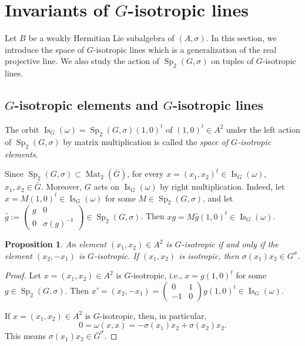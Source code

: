 \documentclass[a4paper,oneside,11pt]{amsart}
\DeclareMathOperator{\Mat}{Mat}
\DeclareMathOperator{\Sp}{Sp}
\DeclareMathOperator{\Is}{Is}
\theoremstyle{plain}
\newtheorem{prop}[teo]{Proposition}
\theoremstyle{definition}
\theoremstyle{remark}
\newcommand{\defin}{\emph}
\begin{document}
\section{Invariants of \texorpdfstring{$G$}{G}-isotropic lines}\label{G-lines}

Let $B$ be a weakly Hermitian Lie subalgebra of $(A,\sigma)$. In this section, we introduce the space of $G$-isotropic lines which is a generalization of the real projective line. We also study the action of $\Sp_2(G,\sigma)$ on tuples of  $G$-isotropic lines.

\subsection{\texorpdfstring{$G$}{G}-isotropic elements and \texorpdfstring{$G$}{G}-isotropic lines}
The orbit $\Is_G(\omega)=\Sp_2(G,\sigma)(1,0)^t$  of $(1,0)^t\in A^2$ under the left action of $\Sp_2(G,\sigma)$ by matrix multiplication is called the \defin{space of $G$-isotropic elements}.

Since $\Sp_2(G,\sigma)\subset\Mat_2(\bar G)$, for every $x=(x_1,x_2)^t\in \Is_G(\omega)$, $x_1,x_2\in \bar G$. Moreover, $G$ acts on $\Is_G(\omega)$ by right multiplication. Indeed, let $x=M(1,0)^t\in \Is_G(\omega)$ for some $M\in\Sp_2(G,\sigma)$, and  let $\hat g:=\begin{pmatrix}
        g & 0 \\
        0 & \sigma(g)^{-1}
    \end{pmatrix}\in\Sp_2(G,\sigma)$. Then $xg=M \hat g (1,0)^t\in \Is_G(\omega)$.

\begin{prop}
    An element $(x_1,x_2)\in A^2$ is $G$-isotropic if and only if the element $(x_2,-x_1)$ is $G$-isotropic. If $(x_1,x_2)$ is isotropic, then $\sigma(x_1)x_2\in G^\sigma$.
\end{prop}

\begin{proof}
    Let $x=(x_1,x_2)\in A^2$ is $G$-isotropic, i.e., $x=g(1,0)^t$ for some $g\in \Sp_2(G,\sigma)$. Then $x'=(x_2,-x_1)=\begin{pmatrix}
        0 & 1 \\
        -1 & 0
    \end{pmatrix}g(1,0)^t\in\Is_G(\omega)$.

    If $x=(x_1,x_2)\in A^2$ is $G$-isotropic, then, in particular,
    $$0=\omega(x,x)=-\sigma(x_1)x_2+\sigma(x_2)x_2.$$
    This means $\sigma(x_1)x_2\in \bar G^\sigma$.
\end{proof}
\end{document}
